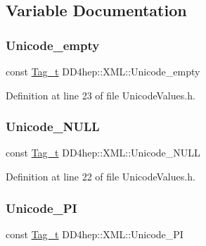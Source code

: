 \subsection{Variable Documentation}
\hypertarget{namespace_d_d4hep_1_1_x_m_l_a9d7a489ad1c7479f1f8905d8d0355e05}{}\label{namespace_d_d4hep_1_1_x_m_l_a9d7a489ad1c7479f1f8905d8d0355e05} 
\subsubsection{\texorpdfstring{Unicode\+\_\+empty}{Unicode\_empty}}
{\footnotesize\ttfamily const \hyperlink{class_d_d4hep_1_1_x_m_l_1_1_tag__t}{Tag\+\_\+t} D\+D4hep\+::\+X\+M\+L\+::\+Unicode\+\_\+empty}



Definition at line 23 of file Unicode\+Values.\+h.

\hypertarget{namespace_d_d4hep_1_1_x_m_l_af00c09760c810b5f8ce25c7becedbec4}{}\label{namespace_d_d4hep_1_1_x_m_l_af00c09760c810b5f8ce25c7becedbec4} 
\subsubsection{\texorpdfstring{Unicode\+\_\+\+N\+U\+LL}{Unicode\_NULL}}
{\footnotesize\ttfamily const \hyperlink{class_d_d4hep_1_1_x_m_l_1_1_tag__t}{Tag\+\_\+t} D\+D4hep\+::\+X\+M\+L\+::\+Unicode\+\_\+\+N\+U\+LL}



Definition at line 22 of file Unicode\+Values.\+h.

\hypertarget{namespace_d_d4hep_1_1_x_m_l_a7b86f0b182e853fca5f97466cd7767b8}{}\label{namespace_d_d4hep_1_1_x_m_l_a7b86f0b182e853fca5f97466cd7767b8} 
\subsubsection{\texorpdfstring{Unicode\+\_\+\+PI}{Unicode\_PI}}
{\footnotesize\ttfamily const \hyperlink{class_d_d4hep_1_1_x_m_l_1_1_tag__t}{Tag\+\_\+t} D\+D4hep\+::\+X\+M\+L\+::\+Unicode\+\_\+\+PI}



